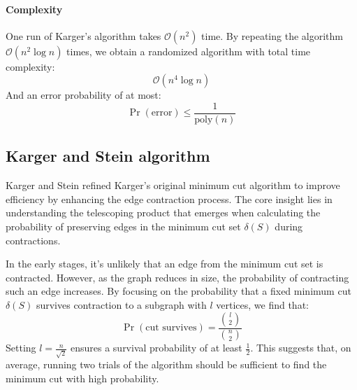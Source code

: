 \paragraph*{Complexity}
One run of Karger's algorithm takes $\mathcal{O}(n^2)$ time.
By repeating the algorithm $\mathcal{O}(n^2\log n)$ times, we obtain a randomized algorithm with total time complexity:
\[\mathcal{O}(n^4\log n)\] 
And an error probability of at most:
\[\Pr(\text{error})\leq\dfrac{1}{\text{poly}(n)}\]

\subsection{Karger and Stein algorithm}
Karger and Stein refined Karger's original minimum cut algorithm to improve efficiency by enhancing the edge contraction process.
The core insight lies in understanding the telescoping product that emerges when calculating the probability of preserving edges in the minimum cut set $\delta(S)$ during contractions.

In the early stages, it's unlikely that an edge from the minimum cut set is contracted. 
However, as the graph reduces in size, the probability of contracting such an edge increases. 
By focusing on the probability that a fixed minimum cut $\delta(S)$ survives contraction to a subgraph with $l$ vertices, we find that:
\[\Pr(\text{cut survives})=\frac{\binom{l}{2}}{\binom{n}{2}}\]
Setting $l=\frac{n}{\sqrt{2}}$ ensures a survival probability of at least $\frac{1}{2}$.
This suggests that, on average, running two trials of the algorithm should be sufficient to find the minimum cut with high probability.


